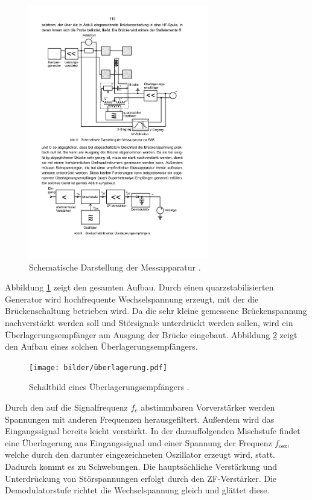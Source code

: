 \begin{figure}
	\centering
  \includegraphics[width=0.7\textwidth] {bilder/aufbau2.pdf}
	\caption{Schematische Darstellung der Messapparatur \cite{anleitung28}.}
	\label{fig:aufbau2}
\end{figure}

Abbildung \ref{fig:aufbau2} zeigt den gesamten Aufbau. Durch einen quarzstabilisierten Generator wird hochfrequente Wechselspannung erzeugt, mit der die Brückenschaltung betrieben wird. Da die sehr kleine gemessene Brückenspannung nachverstärkt werden soll und Störsignale unterdrückt werden sollen, wird ein Überlagerungsempfänger am Ausgang der Brücke eingebaut. Abbildung \ref{fig:ueberlagerung} zeigt den Aufbau eines solchen Überlagerungsempfängers.
\begin{figure}
	\centering
  \texttt{[image: bilder/überlagerung.pdf]}
	\caption{Schaltbild eines Überlagerungsempfängers \cite{anleitung28}.}
	\label{fig:ueberlagerung}
\end{figure}
Durch den auf die Signalfrequenz $f_e$ abstimmbaren Vorverstärker werden Spannungen mit anderen Frequenzen herausgefiltert. Außerdem wird das Eingangssignal bereits leicht verstärkt. In der darauffolgenden Mischstufe findet eine Überlagerung aus Eingangssignal und einer Spannung der Frequenz $f_\mathrm{osz}$, welche durch den darunter eingezeichneten Oszillator erzeugt wird, statt. Dadurch kommt es zu Schwebungen. Die hauptsächliche Verstärkung und Unterdrückung von Störspannungen erfolgt durch den ZF-Verstärker. Die Demodulatorstufe richtet die Wechselspannung gleich und glättet diese.


